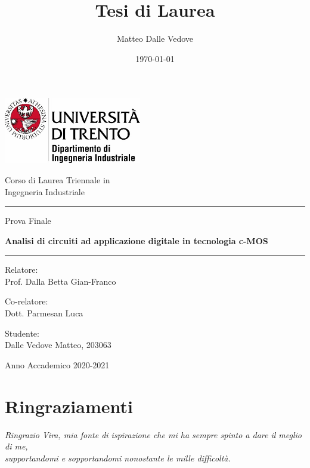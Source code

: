 \documentclass[10 pt,letterpaper,twoside,openright]{book}
\title{Tesi di Laurea}
\author{Matteo Dalle Vedove}
\date{\today}
\begin{document}
	\frontmatter
	
	\thispagestyle{empty}
	\begin{center}
		\includegraphics[width=6cm]{Immagini/logo}
		
		\vspace{2cm}
		{\Large Corso di Laurea Triennale in \\ Ingegneria Industriale}
		
		\vspace{6mm}
		
		\rule{5cm}{0.5pt}	
		\vspace{6mm}
		
		{\LARGE Prova Finale
		
		\vspace{6mm}
		
		\textbf{Analisi di circuiti ad applicazione digitale in tecnologia c-MOS}
		\vspace{6mm}
		
		\rule{5cm}{0.5pt}	
		 }
		
	\end{center}
	{ \large
	\vspace{0.5cm} \noindent
	Relatore:\\ Prof. Dalla Betta Gian-Franco
	
	\vspace{1.5cm} \noindent
	Co-relatore: \\ Dott. Parmesan Luca
	
	\vspace{1.5cm} \noindent
	Studente: \\
	Dalle Vedove Matteo, 203063
	
	\vspace{1.5cm}
	\begin{center}
		Anno Accademico 2020-2021
	\end{center}
	
	}

	\chapter*{Ringraziamenti}
	\begin{flushright}
		\textit{Ringrazio Vira, mia fonte di ispirazione che mi ha sempre spinto a dare il meglio di me,\\ supportandomi e sopportandomi nonostante le mille difficoltà. }
	\end{flushright}
\end{document}
